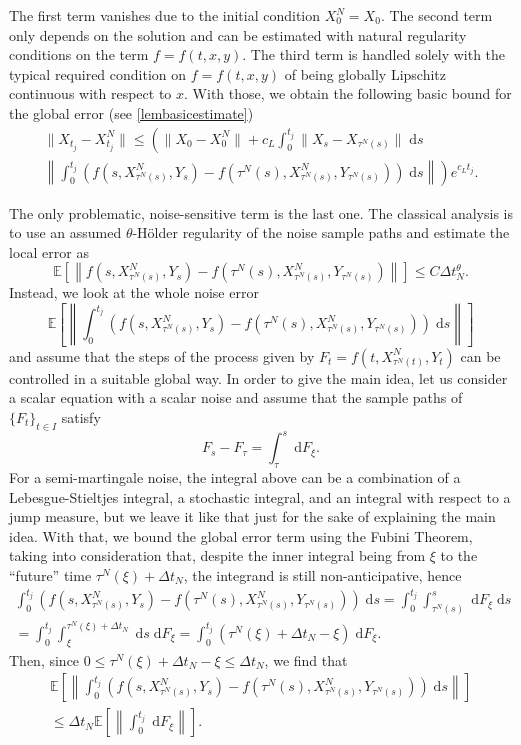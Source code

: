 \documentclass[reqno,12pt]{amsart}
\theoremstyle{plain} %
\theoremstyle{definition} %
\begin{document}
The first term vanishes due to the initial condition $X_0^N = X_0$. The second term only depends on the solution and can be estimated with natural regularity conditions on the term $f=f(t, x, y)$. The third term is handled solely with the typical required condition on $f=f(t, x, y)$ of being globally Lipschitz continuous with respect to $x$. With those, we obtain the following basic bound for the global error (see \cref{lembasicestimate})
\begin{multline}
    \label{Etjbasicboundintro}
        \|X_{t_j} - X_{t_j}^N\| \leq \left( \|X_0 - X_0^N\| + c_L \int_0^{t_j} \|X_s - X_{\tau^N(s)}\| \;\mathrm{d}s \right. \\
        \left. \left\|\int_0^{t_j} \left( f(s, X_{\tau^N(s)}^N, Y_s) - f(\tau^N(s), X_{\tau^N(s)}^N, Y_{\tau^N(s)}) \right)\;\mathrm{d}s\right\|\right) e^{c_L t_j}.
\end{multline}

The only problematic, noise-sensitive term is the last one. The classical analysis is to use an assumed $\theta$-H\"older regularity of the noise sample paths and estimate the local error as
\[
    \mathbb{E}\left[\left\|f(s, X_{\tau^N(s)}^N, Y_s) - f(\tau^N(s), X_{\tau^N(s)}^N, Y_{\tau^N(s)})\right\|\right] \leq C\Delta t_N^{\theta}.
\]
Instead, we look at the whole noise error 
\[
    \mathbb{E}\left[\left\|\int_0^{t_j} \left( f(s, X_{\tau^N(s)}^N, Y_s) - f(\tau^N(s), X_{\tau^N(s)}^N, Y_{\tau^N(s)}) \right)\;\mathrm{d}s\right\|\right]
\]
and assume that the steps of the process given by $F_t = f(t, X_{\tau^N(t)}^N, Y_t)$ can be controlled in a suitable global way. In order to give the main idea, let us consider a scalar equation with a scalar noise and assume that the sample paths of $\{F_t\}_{t\in I}$ satisfy
\[
    F_s - F_\tau = \int_\tau^s \;\mathrm{d}F_\xi.
\]
For a semi-martingale noise, the integral above can be a combination of a Lebesgue-Stieltjes integral, a stochastic integral, and an integral with respect to a jump measure, but we leave it like that just for the sake of explaining the main idea. With that, we bound the global error term using the Fubini Theorem, taking into consideration that, despite the inner integral being from $\xi$ to the ``future'' time $\tau^N(\xi) + \Delta t_N$, the integrand is still non-anticipative, hence
\begin{multline*}
    \int_0^{t_j} \left( f(s, X_{\tau^N(s)}^N, Y_s) - f(\tau^N(s), X_{\tau^N(s)}^N, Y_{\tau^N(s)}) \right)\;\mathrm{d}s = \int_0^{t_j} \int_{\tau^N(s)}^s \;\mathrm{d}  F_\xi\;\mathrm{d}s \\
    = \int_0^{t_j} \int_{\xi}^{\tau^N(\xi) + \Delta t_N} \;\mathrm{d}s \;\mathrm{d} F_\xi  = \int_0^{t_j} (\tau^N(\xi) + \Delta t_N - \xi) \;\mathrm{d} F_\xi.
\end{multline*}
Then, since $0 \leq \tau^N(\xi) + \Delta t_N - \xi \leq \Delta t_N$, we find that
\begin{multline*}
    \mathbb{E}\left[\left\| \int_0^{t_j} \left( f(s, X_{\tau^N(s)}^N, Y_s) - f(\tau^N(s), X_{\tau^N(s)}^N, Y_{\tau^N(s)}) \right)\;\mathrm{d}s\right\|\right] \\
    \leq \Delta t_N\mathbb{E}\left[\left\| \int_0^{t_j} \;\mathrm{d} F_\xi \right\|\right].
\end{multline*}
\end{document}
